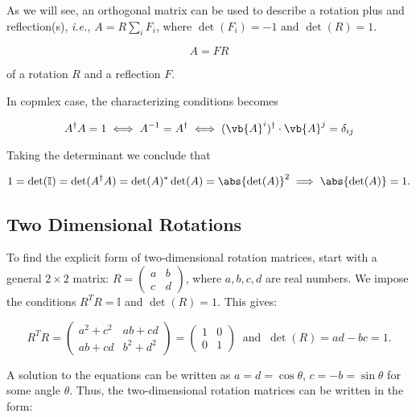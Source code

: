\documentclass[a4paper,12pt]{report}
\begin{document}
As we will see, an orthogonal matrix can be used to describe a rotation plus and reflection(s), \textit{i.e.,} \(A = R\sum_{i}^{}F_{i}  \), where \(\det (F_{i} ) = -1 \text { and } \det (R) = 1\). 

\begin{equation}
    A = FR
\end{equation}

of a rotation \(R\) and a reflection \(F\). 

In copmlex case, the characterizing conditions becomes

\begin{equation}
    A^{\dagger} A = 1 \iff A^{-1} = A^{\dagger} \iff (\vb{A} ^{i} )^{\dagger} \cdot  \vb{A} ^{j} = \delta _{ij}
\end{equation}

Taking the determinant we conclude that 

\begin{equation}
    1 = \det (\mathbb{I}) = \det (A^{\dagger} A) = \det (A)^*\det (A) = \abs{\det (A)}^2 \implies \abs{\det (A)} = 1. 
\end{equation}

\subsection{Two Dimensional Rotations}

To find the explicit form of two-dimensional rotation matrices, start with a general \(2 \times 2\) matrix: \(R = \begin{pmatrix} a & b \\ c & d \end{pmatrix}\), where \(a, b, c, d\) are real numbers. We impose the conditions \(R^T R = \mathbb{I}\) and \(\det(R) = 1\). This gives:

\begin{equation}
R^T R = \begin{pmatrix} a^2 + c^2 & ab + cd \\ ab + cd & b^2 + d^2 \end{pmatrix} = \begin{pmatrix} 1 & 0 \\ 0 & 1 \end{pmatrix} ~\text { and }~  
\det(R) = ad - bc = 1.
\end{equation}

A solution to the equations can be written as \(a = d = \cos\theta\), \(c = -b = \sin\theta\) for some angle \(\theta\). Thus, the two-dimensional rotation matrices can be written in the form:
\end{document}
